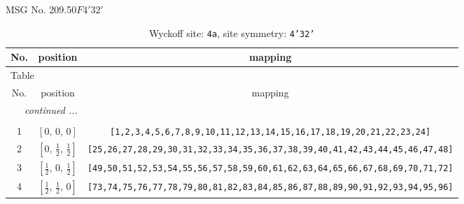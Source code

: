 \documentclass[fleqn,8pt]{jsarticle}
\begin{document}
\setcounter{MaxMatrixCols}{32}

\renewcommand{\tablename}{Table~}
\renewcommand{\figurename}{Figure~}
\begin{center}
\LARGE
MSG No. 209.50\quad$F4'32'$
\end{center}
\renewcommand{\arraystretch}{1.2}
\begin{longtable}{ccc}
\caption{Wyckoff site: {\tt 4a}, site symmetry: {\tt 4'32'}}
 \\
 \hline \hline
No. & position & mapping \\ \hline \endfirsthead

\multicolumn{2}{l}{\tablename\ \thetable{}} \\
 \hline \hline
No. & position & mapping \\ \hline \endhead

 \hline \hline
\multicolumn{2}{r}{\footnotesize\it continued ...} \\ \endfoot

 \hline \hline
\multicolumn{2}{r}{} \\ \endlastfoot

1 & $\left[ 0,\, 0,\, 0 \right]$ & {\tt [1,2,3,4,5,6,7,8,9,10,11,12,13,14,15,16,17,18,19,20,21,22,23,24]} \\ \hline
2 & $\left[ 0,\, \frac{1}{2},\, \frac{1}{2} \right]$ & {\tt [25,26,27,28,29,30,31,32,33,34,35,36,37,38,39,40,41,42,43,44,45,46,47,48]} \\ \hline
3 & $\left[ \frac{1}{2},\, 0,\, \frac{1}{2} \right]$ & {\tt [49,50,51,52,53,54,55,56,57,58,59,60,61,62,63,64,65,66,67,68,69,70,71,72]} \\ \hline
4 & $\left[ \frac{1}{2},\, \frac{1}{2},\, 0 \right]$ & {\tt [73,74,75,76,77,78,79,80,81,82,83,84,85,86,87,88,89,90,91,92,93,94,95,96]} \\
\end{longtable}
\renewcommand{\arraystretch}{1.2}
\end{document}
